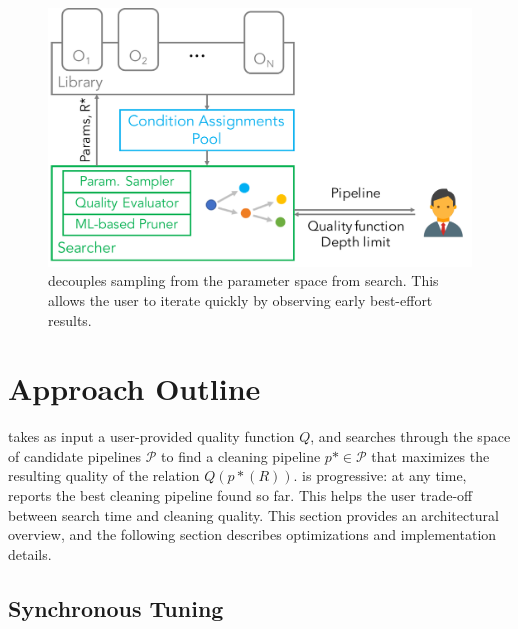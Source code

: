 \begin{figure}[t]
\centering
 \includegraphics[width=0.7\columnwidth]{figures/arch}
 \caption{\small \sys decouples sampling from the parameter space from search. This allows the user to iterate quickly by observing early best-effort results. \label{fig:arch}}
\end{figure}



\section{Approach Outline}

\sys takes as input a user-provided quality function $Q$, and searches through the space of candidate pipelines $\mathcal{P}$ to find a cleaning pipeline $p*\in\mathcal{P}$ that maximizes the resulting quality of the relation $Q(p*(R))$.  \sys is progressive: at any time, \sys reports the best cleaning pipeline found so far.  This helps the user trade-off between search time and cleaning quality.  This section provides an architectural overview, and the following section describes optimizations and implementation details.





\subsection{Synchronous Tuning}


